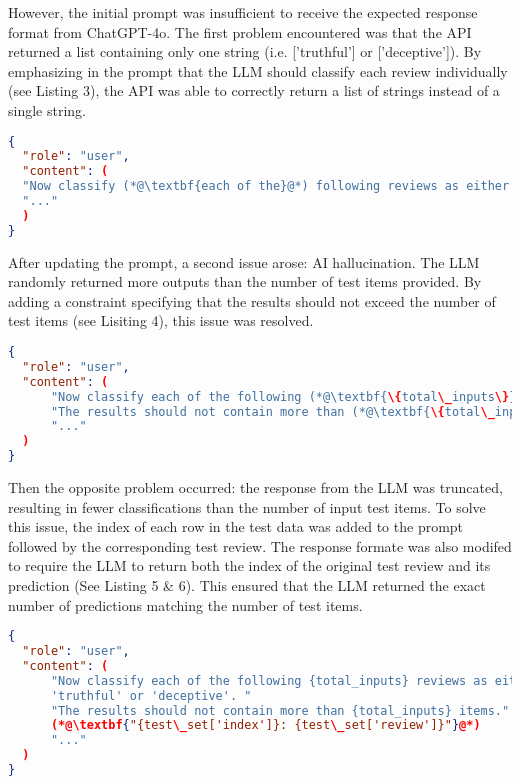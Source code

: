 \documentclass[sigconf, nonacm]{acmart}
\theoremstyle{definition}
\begin{document}
However, the initial prompt was insufficient to receive the expected response format from ChatGPT-4o. The first problem encountered was that the API returned a list containing only one string (i.e. ['truthful'] or ['deceptive']). By emphasizing in the prompt that the LLM should classify each review individually (see Listing 3), the API was able to correctly return a list of strings instead of a single string.

\begin{lstlisting}[language=json, caption={Updated User Messages 1}]
{
  "role": "user",
  "content": (
  "Now classify (*@\textbf{each of the}@*) following reviews as either 'truthful' or 'deceptive'. "
  "..."
  )
}
\end{lstlisting}

After updating the prompt, a second issue arose: AI hallucination. The LLM randomly returned more outputs than the number of test items provided. By adding a constraint specifying that the results should not exceed the number of test items (see Lisiting 4), this issue was resolved.

\begin{lstlisting}[language=json, caption={Updated User Messages 2}]
{
  "role": "user",
  "content": (
      "Now classify each of the following (*@\textbf{\{total\_inputs\}}@*) reviews as either 'truthful' or 'deceptive'. "
      "The results should not contain more than (*@\textbf{\{total\_inputs\}}@*) items."
      "..."
  )
}
\end{lstlisting}

Then the opposite problem occurred: the response from the LLM was truncated, resulting in fewer classifications than the number of input test items. To solve this issue, the index of each row in the test data was added to the prompt followed by the corresponding test review. The response formate was also modifed to require the LLM to return both the index of the original test review and its prediction (See Listing 5 \& 6). This ensured that the LLM returned the exact number of predictions matching the number of test items.

\begin{lstlisting}[language=json, caption={Updated User Messages 3}]
{
  "role": "user",
  "content": (
      "Now classify each of the following {total_inputs} reviews as either 
      'truthful' or 'deceptive'. "
      "The results should not contain more than {total_inputs} items."
      (*@\textbf{"{test\_set['index']}: {test\_set['review']}"}@*)
      "..."
  )
}
\end{lstlisting}
\end{document}
